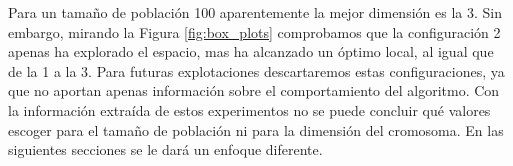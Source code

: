 Para un tamaño de población 100 aparentemente la mejor dimensión es la 3. Sin embargo, mirando la Figura \ref{fig:box_plots} comprobamos
que la configuración 2 apenas ha explorado el espacio, mas ha alcanzado un óptimo local, al igual que de la 1 a la 3. Para
futuras explotaciones descartaremos estas configuraciones, ya que no aportan apenas información sobre el comportamiento del algoritmo.
Con la información extraída de estos experimentos no se puede concluir qué valores escoger para el tamaño de población ni para la
dimensión del cromosoma. En las siguientes secciones se le dará un enfoque diferente.
